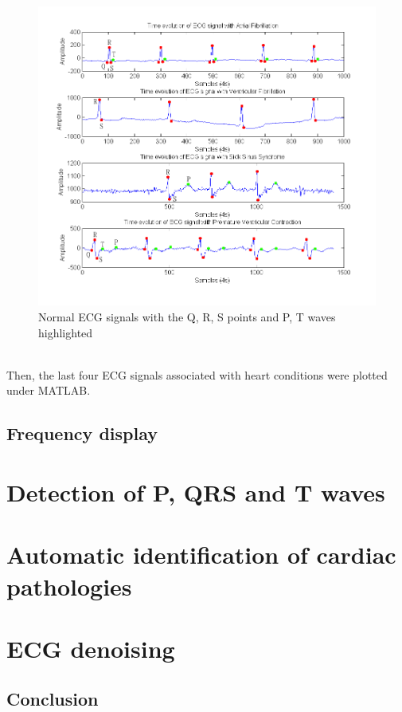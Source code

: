 \documentclass[11pt]{report}
\begin{document}
		\begin{figure}[ht]
			\centering
			\includegraphics[scale=0.65]{images/Q312_2.png}
			\caption{Normal ECG signals with the Q, R, S points and P, T waves highlighted}
			\label{Q312_2}
		\end{figure}
		\\
		Then, the last four ECG signals associated with heart conditions were plotted under MATLAB.
		\\


	\section{Frequency display}


\chapter{Detection of P, QRS and T waves}

\chapter{Automatic identification of cardiac pathologies}

\chapter{ECG denoising}


\newpage
\section*{Conclusion}
\end{document}

